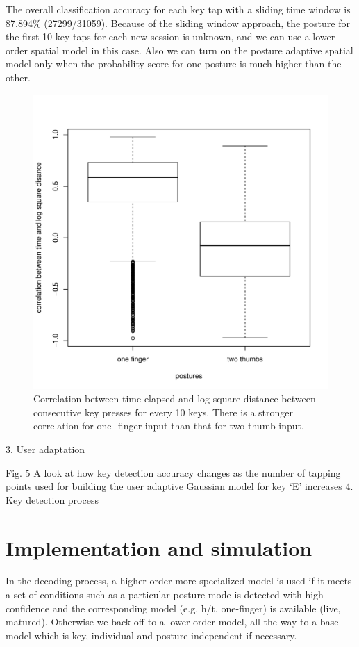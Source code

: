 \documentclass{sigchi}
\begin{document}
The overall classification accuracy for each key tap with a sliding time window
is 87.894\% (27299/31059).
Because of the sliding window approach, the posture for the first 10 key taps for each new session is unknown, and we can use a lower order spatial model in this case. Also we can turn on the posture adaptive spatial model only when the probability score for one posture is much higher than the other.

\begin{figure}[tb]
  \centering
  \includegraphics[width=1\columnwidth]{figures/boxplot.pdf}
  \caption{Correlation between time elapsed and log square distance between
  consecutive key presses for every 10 keys. There is a stronger correlation for
  one- finger input than that for two-thumb input.}
  \label{fig:boxplot}
\end{figure}

3. User adaptation

Fig. 5  A look at how key detection accuracy changes as the number of tapping points used for building the user adaptive Gaussian model for key ‘E’ increases
4. Key detection process 

\section{Implementation and simulation}
In the decoding process, a higher order more specialized model is used if it
meets a set of conditions such as a particular posture mode is detected with high confidence and the corresponding model (e.g. h/t, one-finger) is available (live, matured). Otherwise we back off to a lower order model, all the way to a base model which is key, individual and posture independent if necessary.
\end{document}
